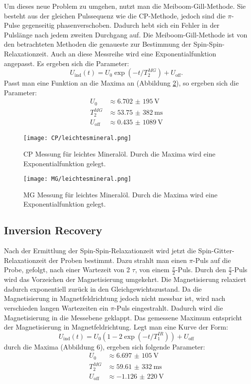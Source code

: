 \documentclass[10pt,twoside]{article}
\renewcommand{\1}{^{-1}}
\renewcommand{\2}{^{-2}}
\newcommand{\3}{^{-3}}
\newcommand{\4}{^{-4}}
\newcommand{\5}{^{-5}}
\newcommand{\6}{^{-6}}
\newcommand{\7}{^{-7}}
\newcommand{\8}{^{-8}}
\newcommand{\9}{^{-9}}
\begin{document}
Um dieses neue Problem zu umgehen, nutzt man die Meiboom-Gill-Methode.
Sie besteht aus der gleichen Pulssequenz wie die CP-Methode, jedoch sind die $\pi$-Pulse gegenseitig phasenverschoben. 
Dadurch hebt sich ein Fehler in der Pulslänge nach jedem zweiten Durchgang auf.
Die Meiboom-Gill-Methode ist von den betrachteten Methoden die genaueste zur Bestimmung der Spin-Spin-Relaxationzeit.
Auch an diese Messreihe wird eine Exponentialfunktion angepasst. Es ergeben sich die Parameter:
\begin{equation}
U_{\text{ind}}(t)=U_0 \exp(-t/T_{2}^{MG}) + U_{\text{off}}{.}
\end{equation}
Passt man eine Funktion an die Maxima an (Abbildung \ref{fig:MG}), so ergeben sich die Parameter:
\begin{align*} 
U_0 	&\approx  \SI{6,702(195)}{\volt} \\ 
T_{2}^{MG} &\approx  \SI{53,75(382)}{\milli\second} \\
U_{\text{off}}	&\approx  \SI{0,435(1089)}{\volt} 
\end{align*}
\begin{figure}[H]
\centering
\texttt{[image: CP/leichtesmineral.png]} 
\caption{CP Messung für leichtes Mineralöl. Durch die Maxima wird eine Exponentialfunktion gelegt.}
\label{fig:CP}
\end{figure}
\newpage
\begin{figure}[H]
\centering
\texttt{[image: MG/leichtesmineral.png]} 
\caption{MG Messung für leichtes Mineralöl. Durch die Maxima wird eine Exponentialfunktion gelegt.}
\label{fig:MG}
\end{figure}
\newpage
\subsection{Inversion Recovery}

Nach der Ermittlung der Spin-Spin-Relaxationzeit wird jetzt die Spin-Gitter-Relaxationzeit der Proben bestimmt.
Dazu strahlt man einen $\pi$-Puls auf die Probe, gefolgt, nach einer Wartezeit von 2 $\tau$, von einem $\frac{\pi}{2}$-Puls.
Durch den $\frac{\pi}{2}$-Puls wird das Vorzeichen der Magnetisierung umgekehrt. Die Magnetisierung relaxiert dadurch exponentiell zurück in den Gleichgewichtszustand. Da die Magnetisierung in Magnetfeldrichtung jedoch nicht messbar ist, wird nach verschieden langen Wartezeiten ein $\pi$-Puls eingestrahlt. Dadurch wird die Magnetisierung in die Messebene geklappt. Das gemessene Maximum entspricht der Magnetisierung in Magnetfeldrichtung.
Legt man eine Kurve der Form:
\begin{equation}
U_{\text{ind}}(t)=U_0 \left( 1- 2 \exp(-t/T_{1}^{IR}) \right) + U_{\text{off}}
\end{equation}
durch die Maxima (Abbildung 6), ergeben sich folgende Parameter:
\begin{align*} 
U_0 	&\approx  \SI{6,697(105)}{\volt} \\ 
T_{2}^{MG} &\approx  \SI{59,61(332)}{\milli\second} \\
U_{\text{off}}	&\approx  \SI{-1,126(220)}{\volt} 
\end{align*}\par
\end{document}
